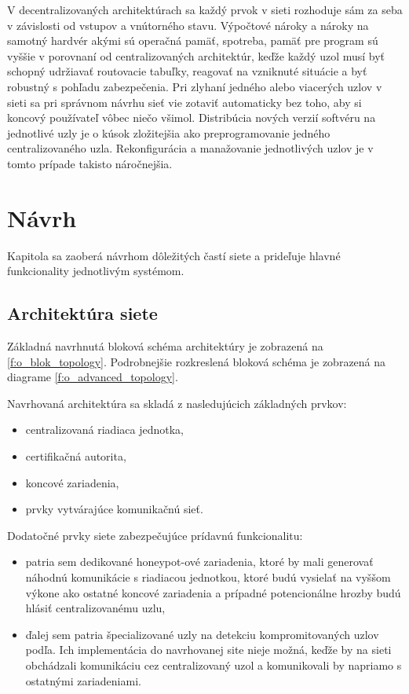 \documentclass[12pt,a4paper,oneside,openright]{report}
\begin{document}
V decentralizovaných architektúrach sa každý prvok v sieti rozhoduje sám za seba v závislosti od vstupov a vnútorného stavu. Výpočtové nároky a nároky na samotný hardvér akými sú operačná pamäť, spotreba, pamäť pre program sú vyššie v porovnaní od centralizovaných architektúr, keďže každý uzol musí byť schopný udržiavať routovacie tabuľky, reagovať na vzniknuté situácie a byť robustný s pohľadu zabezpečenia. Pri zlyhaní jedného alebo viacerých uzlov v sieti sa pri správnom návrhu sieť vie zotaviť automaticky bez toho, aby si koncový používateľ vôbec niečo všimol. Distribúcia nových verzií softvéru na jednotlivé uzly je o kúsok zložitejšia ako preprogramovanie jedného centralizovaného uzla. Rekonfigurácia a manažovanie jednotlivých uzlov je v tomto prípade takisto náročnejšia.



\chapter{Návrh} \label{s_navrh}
Kapitola sa zaoberá návrhom dôležitých častí siete a prideľuje hlavné funkcionality jednotlivým systémom.

\section{Architektúra siete}
Základná navrhnutá bloková schéma architektúry je zobrazená na \ref{f:o_blok_topology}. Podrobnejšie rozkreslená bloková schéma je zobrazená na diagrame \ref{f:o_advanced_topology}.

Navrhovaná architektúra sa skladá z nasledujúcich základných prvkov:
\singlespacing
\begin{itemize}
	\item centralizovaná riadiaca jednotka,
	\item certifikačná autorita,
	\item koncové zariadenia,
	\item prvky vytvárajúce komunikačnú sieť.
\end{itemize}
\onehalfspacing
Dodatočné prvky siete zabezpečujúce prídavnú funkcionalitu:
\singlespacing
\begin{itemize}
	\item patria sem dedikované honeypot-ové zariadenia, ktoré by mali generovať náhodnú komunikácie s riadiacou jednotkou, ktoré budú vysielať na vyššom výkone ako ostatné koncové zariadenia a prípadné potencionálne hrozby budú hlásiť centralizovanému uzlu,
	\item ďalej sem patria špecializované uzly na detekciu kompromitovaných uzlov podľa\cite{compromisedsensors}. Ich implementácia do navrhovanej site nieje možná, keďže by na sieti obchádzali komunikáciu cez centralizovaný uzol a komunikovali by napriamo s ostatnými zariadeniami.
\end{itemize}
\onehalfspacing
\end{document}
